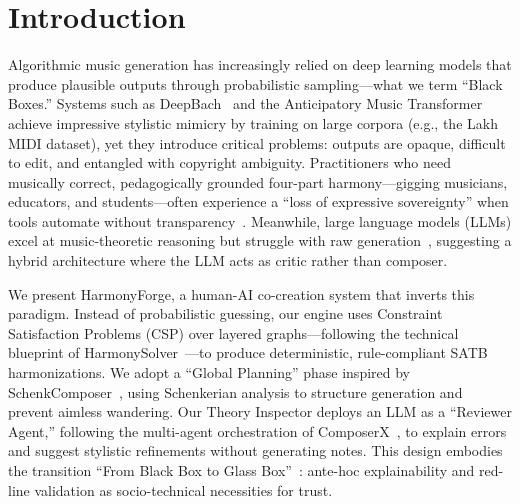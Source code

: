 
\section{Introduction}

Algorithmic music generation has increasingly relied on deep learning models that produce plausible outputs through probabilistic sampling---what we term ``Black Boxes.'' Systems such as DeepBach~\cite{hadjeres2017} and the Anticipatory Music Transformer~\cite{thickstun2024} achieve impressive stylistic mimicry by training on large corpora (e.g., the Lakh MIDI dataset), yet they introduce critical problems: outputs are opaque, difficult to edit, and entangled with copyright ambiguity. Practitioners who need musically correct, pedagogically grounded four-part harmony---gigging musicians, educators, and students---often experience a ``loss of expressive sovereignty'' when tools automate without transparency~\cite{louie2020}. Meanwhile, large language models (LLMs) excel at music-theoretic reasoning but struggle with raw generation~\cite{zhou2024}, suggesting a hybrid architecture where the LLM acts as critic rather than composer.

We present HarmonyForge, a human-AI co-creation system that inverts this paradigm. Instead of probabilistic guessing, our engine uses Constraint Satisfaction Problems (CSP) over layered graphs---following the technical blueprint of HarmonySolver~\cite{dajda2020}---to produce deterministic, rule-compliant SATB harmonizations. We adopt a ``Global Planning'' phase inspired by SchenkComposer~\cite{hahn2023}, using Schenkerian analysis to structure generation and prevent aimless wandering. Our Theory Inspector deploys an LLM as a ``Reviewer Agent,'' following the multi-agent orchestration of ComposerX~\cite{deng2024}, to explain errors and suggest stylistic refinements without generating notes. This design embodies the transition ``From Black Box to Glass Box''~\cite{liu2025}: ante-hoc explainability and red-line validation as socio-technical necessities for trust.

